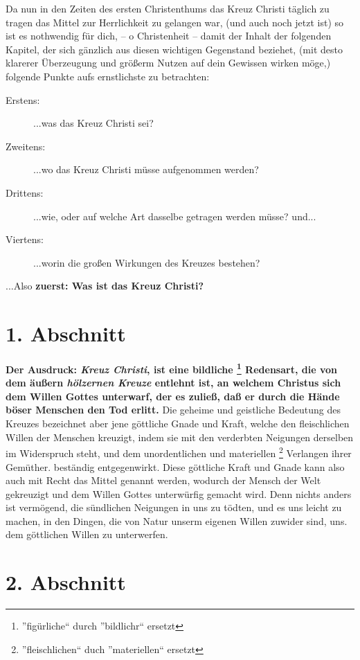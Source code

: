 Da nun in den Zeiten des ersten Christenthums das Kreuz Christi täglich zu
tragen das Mittel zur Herrlichkeit zu gelangen war, (und auch noch jetzt ist)
so ist es nothwendig für dich, -- o Christenheit -- damit der Inhalt der folgenden
Kapitel, der sich gänzlich aus diesen wichtigen Gegenstand beziehet, (mit desto
klarerer Überzeugung und größerm Nutzen auf dein Gewissen wirken möge,) 
folgende Punkte aufs ernstlichste zu betrachten:
\begin{description}
\item[Erstens:] ...was das Kreuz Christi sei?
\item[Zweitens:] ...wo das Kreuz Christi müsse aufgenommen werden?
\item[Drittens:] ...wie, oder auf welche Art dasselbe getragen werden müsse? und...
\item[Viertens:] ...worin die großen Wirkungen des Kreuzes bestehen?
\end{description}

...Also \textbf{zuerst: Was ist das Kreuz Christi?}

\section{1. Abschnitt} \label{kap3_ab1} 
\textbf{Der Ausdruck: \textit{Kreuz Christi}, ist eine bildliche \footnote{
''figürliche`` durch ''bildlichr`` ersetzt} Redensart, die von dem äußern
\textit{hölzernen Kreuze} entlehnt ist, an welchem
 Christus sich dem Willen Gottes
unterwarf, der es zuließ, daß er durch die Hände böser Menschen den Tod erlitt.}
Die geheime und geistliche Bedeutung des Kreuzes bezeichnet aber jene göttliche
Gnade und Kraft, welche den fleischlichen Willen der Menschen kreuzigt, indem
sie mit den verderbten Neigungen derselben im Widerspruch steht, und dem
unordentlichen und materiellen \footnote{''fleischlichen`` duch ''materiellen`` 
ersetzt} Verlangen ihrer Gemüther. beständig
entgegenwirkt. Diese göttliche Kraft und Gnade kann also auch mit Recht das
Mittel genannt werden, wodurch der Mensch der Welt gekreuzigt und dem Willen
Gottes unterwürfig gemacht wird. Denn nichts anders ist vermögend, die
sündlichen Neigungen in uns zu tödten, und es uns leicht zu machen, in den
Dingen, die von Natur unserm eigenen Willen zuwider sind, uns. dem göttlichen
Willen zu unterwerfen.

\section{2. Abschnitt} \label{kap3_ab2} 

